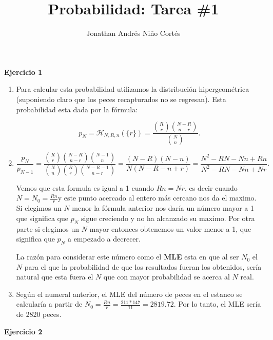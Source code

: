 \documentclass[letter,twoside,12pt]{article}
\title{Probabilidad: Tarea \#1}
\author{Jonathan Andrés Niño Cortés}
\begin{document}
\maketitle
\textbf{Ejercicio 1}
\begin{enumerate}[label=\textbf{\arabic*)}]
\item Para calcular esta probabilidad utilizamos la distribución hipergeométrica (suponiendo claro que los peces recapturados no se regresan). Esta probabilidad esta dada por la fórmula:

\begin{equation}
p_N=\mathcal{H}_{N,R,n}(\{r\})=\frac{\binom{R}{r}\binom{N-R}{n-r}}{\binom{N}{n}} \nonumber.
\end{equation}

\item 
\begin{equation}
\frac{p_N}{p_{N-1}} = \frac{\binom{R}{r}\binom{N-R}{n-r}\binom{N-1}{n}}{\binom{N}{n}\binom{R}{r}\binom{N-R-1}{n-r}}=\frac{(N-R)(N-n)}{N(N-R-n+r)}=\frac{N^2-RN-Nn+Rn}{N^2-RN-Nn+Nr} \nonumber.
\end{equation}

Vemos que esta formula es igual a 1 cuando $ Rn = Nr $, es decir cuando $N=N_0=\frac{Rn}{r}$y este punto acercado al entero más cercano nos da el maximo. Si elegimos un $N$ menor la fórmula anterior nos daría un número mayor a 1 que significa que $p_N$ sigue creciendo y no ha alcanzado su maximo. Por otra parte si elegimos un $ N $ mayor entonces obtenemos un valor menor a 1, que significa que $p_N$ a empezado a decrecer.

La razón para considerar este número como el \textbf{MLE} esta en que al ser $ N_0 $ el $N$ para el que la probabilidad de que los resultados fueran los obtenidos, sería natural que esta fuera el $N$ que con mayor probabilidad se acerca al $ N $ real.
\item Según el numeral anterior, el MLE del número de peces en el estanco se calcularía a partir de $ N_0= \frac{Rn}{r} = \frac{211*147}{11}=2819.72$. Por lo tanto, el MLE sería de 2820 peces. 
\end{enumerate}
\textbf{Ejercicio 2}
\end{document}
